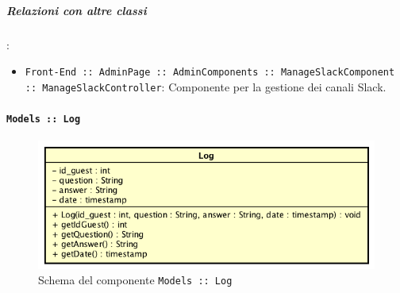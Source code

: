 \documentclass[../DefinizioneDiProdotto_v2.0.0.tex]{subfiles}
\begin{document}
			\subparagraph{Relazioni con altre classi}:
			\begin{itemize}
				\item \texttt{Front-End :: AdminPage :: AdminComponents :: ManageSlackComponent :: ManageSlackController}: Componente per la gestione dei canali Slack.
			\end{itemize}


	\newpage
	\paragraph{\texttt{Models :: Log}}
	\acapo
	\begin{figure}[!h]
		\centering
		\includegraphics[scale=0.6]{Architettura/Front-End/Models/Log.png}
		\caption{Schema del componente \texttt{Models :: Log}}
	\end{figure}
\end{document}
